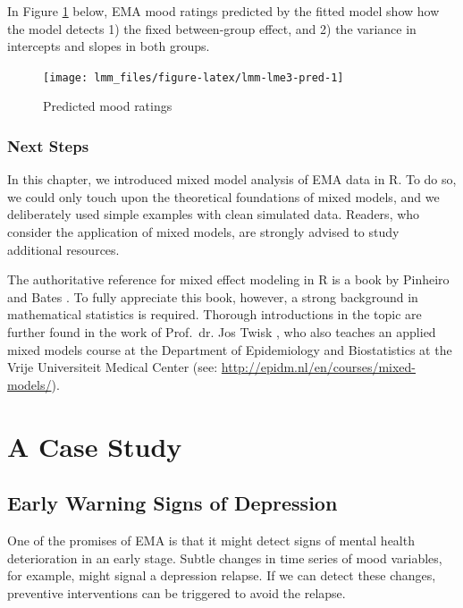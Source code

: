 \documentclass[]{book}
\begin{document}
In Figure \ref{fig:lmm-lme3-pred} below, EMA mood ratings predicted by
the fitted model show how the model detects 1) the fixed between-group
effect, and 2) the variance in intercepts and slopes in both groups.

\begin{figure}

{\centering \texttt{[image: lmm\_files/figure-latex/lmm-lme3-pred-1]} 

}

\caption{Predicted mood ratings}\label{fig:lmm-lme3-pred}
\end{figure}

\section{Next Steps}\label{next-steps}

In this chapter, we introduced mixed model analysis of EMA data in R. To
do so, we could only touch upon the theoretical foundations of mixed
models, and we deliberately used simple examples with clean simulated
data. Readers, who consider the application of mixed models, are
strongly advised to study additional resources.

The authoritative reference for mixed effect modeling in R is a book by
Pinheiro and Bates \citeyearpar{Pinheiro2000}. To fully appreciate this
book, however, a strong background in mathematical statistics is
required. Thorough introductions in the topic are further found in the
work of Prof.~dr. Jos Twisk \citep{twisk2006, twisk2013}, who also
teaches an applied mixed models course at the Department of Epidemiology
and Biostatistics at the Vrije Universiteit Medical Center (see:
\url{http://epidm.nl/en/courses/mixed-models/}).

\part{A Case Study}\label{part-a-case-study}

\chapter{Early Warning Signs of Depression}\label{csd}

One of the promises of EMA is that it might detect signs of mental
health deterioration in an early stage. Subtle changes in time series of
mood variables, for example, might signal a depression relapse. If we
can detect these changes, preventive interventions can be triggered to
avoid the relapse.
\end{document}
